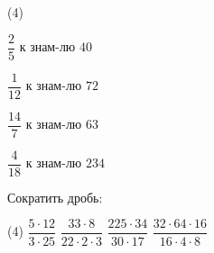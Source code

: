 \begin{class}[number=7]
\begin{listofex}
	\begin{tasks}(4)
		\item \( \dfrac{2}{5} \) к знам-лю \( 40 \)
		\item \( \dfrac{1}{12} \) к знам-лю \( 72 \)
		\item \( \dfrac{14}{7} \) к знам-лю \( 63 \)
		\item \( \dfrac{4}{18} \) к знам-лю \( 234 \)
	\end{tasks}
	\item Сократить дробь:
	\begin{tasks}(4)
		\task \( \dfrac{5\cdot12}{3\cdot25} \)
		\task \( \dfrac{33\cdot8}{22\cdot2\cdot3} \)
		\task \( \dfrac{225\cdot34}{30\cdot17} \)
		\task \( \dfrac{32\cdot64\cdot16}{16\cdot4\cdot8} \)
	\end{tasks}
	\end{listofex}
\end{class}

